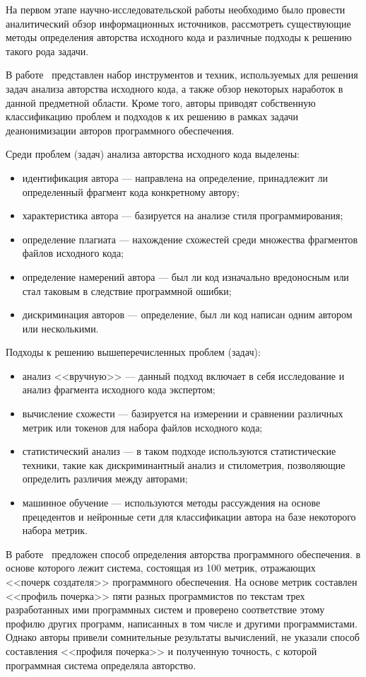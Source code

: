 На первом этапе научно-исследовательской работы необходимо было провести аналитический обзор информационных источников, рассмотреть существующие методы определения авторства исходного кода и различные подходы к решению такого рода задачи. 

В работе~\cite{frantz} представлен набор инструментов и техник, используемых для решения задач анализа авторства исходного кода, а также обзор некоторых наработок в данной предметной области. Кроме того, авторы приводят собственную классификацию проблем и подходов к их решению в рамках задачи деанонимизации авторов программного обеспечения. 

Среди проблем (задач) анализа авторства исходного кода выделены:
\begin{itemize}
  \item идентификация автора --- направлена на определение, принадлежит ли определенный фрагмент кода конкретному автору;
  \item характеристика автора --- базируется на анализе стиля программирования; 
  \item определение плагиата --- нахождение схожестей среди множества фрагментов файлов исходного кода;
  \item определение намерений автора --- был ли код изначально вредоносным или стал таковым в следствие программной ошибки;
  \item дискриминация авторов --- определение, был ли код написан одним автором или несколькими.
\end{itemize}

Подходы к решению вышеперечисленных проблем (задач):
\begin{itemize}
  \item анализ <<вручную>> --- данный подход включает в себя исследование и анализ фрагмента исходного кода экспертом; 
  \item вычисление схожести --- базируется на измерении и сравнении различных метрик или токенов для набора файлов исходного кода;
  \item статистический анализ --- в таком подходе используются статистические техники, такие как дискриминантный анализ и стилометрия, позволяющие определить различия между авторами;
  \item машинное обучение --- используются методы рассуждения на основе прецедентов и нейронные сети для классификации автора на базе некоторого набора метрик.
\end{itemize}

В работе~\cite{maevsky} предложен способ определения авторства программного обеспечения. в основе которого лежит система, состоящая из 100 метрик, отражающих <<почерк создателя>> программного обеспечения. На основе метрик составлен <<профиль почерка>> пяти разных программистов по текстам трех разработанных ими программных систем и проверено соответствие этому профилю других программ, написанных в том числе и другими программистами. Однако авторы привели сомнительные результаты вычислений, не указали способ составления <<профиля почерка>> и полученную точность, с которой программная система определяла авторство.

